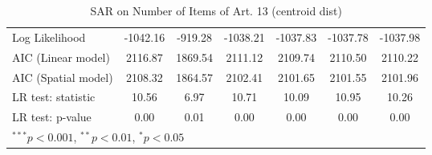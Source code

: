 \begin{table}[!h]
\begin{center}
\begin{tabular}{l c c c c c c }
Log Likelihood          & -1042.16    & -919.28     & -1038.21    & -1037.83    & -1037.78    & -1037.98    \\
AIC (Linear model)      & 2116.87     & 1869.54     & 2111.12     & 2109.74     & 2110.50     & 2110.22     \\
AIC (Spatial model)     & 2108.32     & 1864.57     & 2102.41     & 2101.65     & 2101.55     & 2101.96     \\
LR test: statistic      & 10.56       & 6.97        & 10.71       & 10.09       & 10.95       & 10.26       \\
LR test: p-value        & 0.00        & 0.01        & 0.00        & 0.00        & 0.00        & 0.00        \\
\bottomrule
\multicolumn{7}{l}{\scriptsize{$^{***}p<0.001$, $^{**}p<0.01$, $^*p<0.05$}}
\end{tabular}
\caption{SAR on Number of Items of Art. 13 (centroid dist)}
\label{table:coefficients}
\end{center}
\end{table}
